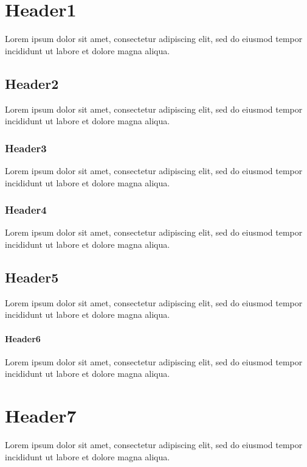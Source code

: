 \section{Header1}
Lorem ipsum dolor sit amet, consectetur adipiscing elit, sed do eiusmod tempor incididunt ut labore et dolore magna aliqua.
\subsection{Header2}
Lorem ipsum dolor sit amet, consectetur adipiscing elit, sed do eiusmod tempor incididunt ut labore et dolore magna aliqua.
\subsubsection{Header3}
Lorem ipsum dolor sit amet, consectetur adipiscing elit, sed do eiusmod tempor incididunt ut labore et dolore magna aliqua.
\subsubsection{Header4}
Lorem ipsum dolor sit amet, consectetur adipiscing elit, sed do eiusmod tempor incididunt ut labore et dolore magna aliqua.
\subsection{Header5}
Lorem ipsum dolor sit amet, consectetur adipiscing elit, sed do eiusmod tempor incididunt ut labore et dolore magna aliqua.
\paragraph{Header6}
Lorem ipsum dolor sit amet, consectetur adipiscing elit, sed do eiusmod tempor incididunt ut labore et dolore magna aliqua.
\section{Header7}
Lorem ipsum dolor sit amet, consectetur adipiscing elit, sed do eiusmod tempor incididunt ut labore et dolore magna aliqua.
